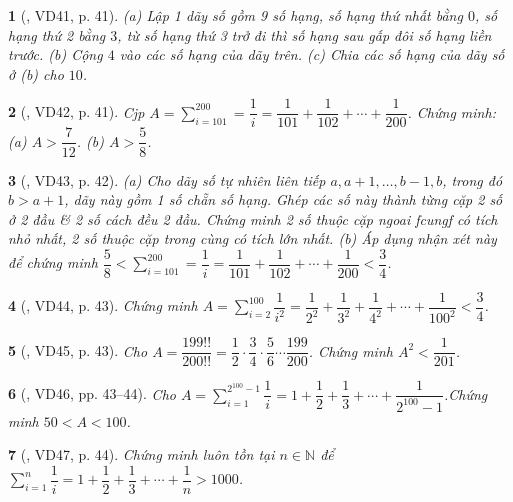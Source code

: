 \documentclass{article}
\newtheorem{baitoan}{}
\begin{document}
\begin{baitoan}[\cite{Binh_Toan_6_tap_2}, VD41, p. 41]
	(a) Lập 1 dãy số gồm 9 số hạng, số hạng thứ nhất bằng $0$, số hạng thứ 2 bằng $3$, từ số hạng thứ 3 trở đi thì số hạng sau gấp đôi số hạng liền trước. (b) Cộng $4$ vào các số hạng của dãy trên. (c) Chia các số hạng của dãy số ở (b) cho $10$.
\end{baitoan}

\begin{baitoan}[\cite{Binh_Toan_6_tap_2}, VD42, p. 41]
	Cjp $A = \sum_{i=101}^{200} = \dfrac{1}{i} = \dfrac{1}{101} + \dfrac{1}{102} + \cdots + \dfrac{1}{200}$. Chứng minh: (a) $A > \dfrac{7}{12}$. (b) $A > \dfrac{5}{8}$.
\end{baitoan}

\begin{baitoan}[\cite{Binh_Toan_6_tap_2}, VD43, p. 42]
	(a) Cho dãy số tự nhiên liên tiếp $a,a + 1,\ldots,b - 1,b$, trong đó $b > a + 1$, dãy này gồm 1 số chẵn số hạng. Ghép các số này thành từng cặp 2 số ở 2 đầu \& 2 số cách đều 2 đầu. Chứng minh 2 số thuộc cặp ngoai fcungf có tích nhỏ nhất, 2 số thuộc cặp trong cùng có tích lớn nhất. (b) Áp dụng nhận xét này để chứng minh $\dfrac{5}{8} < \sum_{i=101}^{200} = \dfrac{1}{i} = \dfrac{1}{101} + \dfrac{1}{102} + \cdots + \dfrac{1}{200} < \dfrac{3}{4}$.
\end{baitoan}

\begin{baitoan}[\cite{Binh_Toan_6_tap_2}, VD44, p. 43]
	Chứng minh $A = \sum_{i=2}^{100} \dfrac{1}{i^2} = \dfrac{1}{2^2} + \dfrac{1}{3^2} + \dfrac{1}{4^2} + \cdots + \dfrac{1}{100^2} < \dfrac{3}{4}$.
\end{baitoan}

\begin{baitoan}[\cite{Binh_Toan_6_tap_2}, VD45, p. 43]
	Cho $A = \dfrac{199!!}{200!!} = \dfrac{1}{2}\cdot\dfrac{3}{4}\cdot\dfrac{5}{6}\cdots\dfrac{199}{200}$. Chứng minh $A^2 < \dfrac{1}{201}$.
\end{baitoan}

\begin{baitoan}[\cite{Binh_Toan_6_tap_2}, VD46, pp. 43--44]
	Cho $A = \sum_{i=1}^{2^{100} - 1} \dfrac{1}{i} = 1 + \dfrac{1}{2} + \dfrac{1}{3} + \cdots + \dfrac{1}{2^{100} - 1}$.Chứng minh $50 < A < 100$.
\end{baitoan}

\begin{baitoan}[\cite{Binh_Toan_6_tap_2}, VD47, p. 44]
	Chứng minh luôn tồn tại $n\in\mathbb{N}$ để $\sum_{i=1}^n \dfrac{1}{i} = 1 + \dfrac{1}{2} + \dfrac{1}{3} + \cdots + \dfrac{1}{n} > 1000$.
\end{baitoan}
\end{document}
